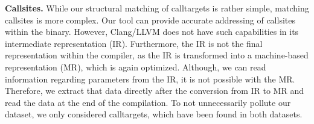 \textbf{Callsites.} While our structural matching of calltargets is rather simple, matching callsites is more complex. Our tool can provide accurate addressing of 
callsites within the binary. However, Clang/LLVM does not have such capabilities in its intermediate representation (IR). Furthermore, the IR is not the final representation within
the compiler, as the IR is transformed into a machine-based representation (MR), which is again optimized. Although, we can read information regarding parameters from the IR, it 
is not possible with the MR. Therefore, we extract that data directly after the conversion from IR to MR and read the data at the end of the compilation. To not unnecessarily 
pollute our dataset, we only considered calltargets, which have been found in both datasets. 


